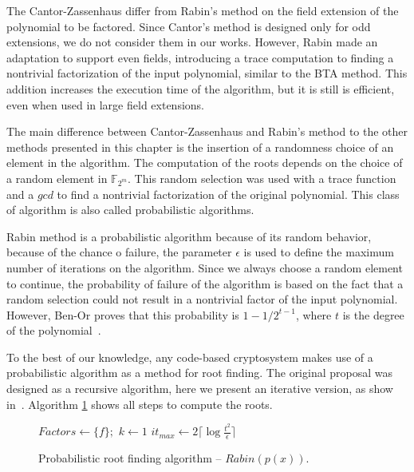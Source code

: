 The Cantor-Zassenhaus differ from Rabin's method on the field extension of the polynomial to be factored. Since Cantor's method is designed only for odd extensions, we do not consider them in our works. However, Rabin made an adaptation to support even fields, introducing a trace computation to finding a nontrivial factorization of the input polynomial, similar to the BTA method. This addition increases the execution time of the algorithm, but it is still is efficient, even when used in large field extensions. 

The main difference between Cantor-Zassenhaus and Rabin's method to the other methods presented in this chapter is the insertion of a randomness choice of an element in the algorithm. The computation of the roots depends on the choice of a random element in $\mathbb{F}_{2^{m}}$. This random selection was used with a trace function and a $gcd$ to find a nontrivial factorization of the original polynomial. This class of algorithm is also called probabilistic algorithms.

Rabin method is a probabilistic algorithm because of its random behavior, because of the chance o failure, the parameter $\epsilon$ is used to define the maximum number of iterations on the algorithm. Since we always choose a random element to continue, the probability of failure of the algorithm is based on the fact that a random selection could not result in a nontrivial factor of the input polynomial. However, Ben-Or proves that this probability is $1 - 1/2^{t-1}$, where $t$ is the degree of the polynomial~\cite{ben1981probabilistic}.

To the best of our knowledge, any code-based cryptosystem makes use of a probabilistic algorithm as a method for root finding. The original proposal was designed as a recursive algorithm, here we present an iterative version, as show in~\cite{von2001factoring}. Algorithm \ref{alg:new} shows all steps to compute the roots. 


\begin{figure}[ht]
\begin{algorithm}[H]
    $Factors \gets \{f\};$ 
    $k \gets 1$\;
    $it_{max} \gets 2 \lceil\log{\frac{t^2}{\epsilon}}\rceil$\;
 \caption{Probabilistic root finding algorithm -- $Rabin(p(x))$.}
  \label{alg:new}
\end{algorithm}
\end{figure}

